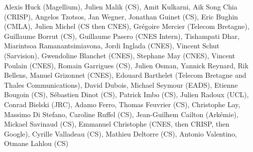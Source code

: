 Alexis Huck (Magellium), Julien Malik (CS), Amit Kulkarni, Aik Song Chia (CRISP), Angelos Tzotsos, Jan Wegner, Jonathan Guinet (CS), Eric Bughin (CMLA), Julien Michel (CS then CNES), Gr\'egoire Mercier (Telecom Bretagne), Guillaume Borrut (CS), Guillaume Pasero (CNES Intern), Tishampati Dhar, Miarintsoa Ramanantsimiavona, Jordi Inglada (CNES), Vincent Schut (Sarvision), Gwendoline Blanchet (CNES), Stephane May (CNES), Vincent Poulain (CNES), Romain Garrigues (CS), Julien Osman, Yannick Reynard, Rik Bellens, Manuel Grizonnet (CNES), Edouard Barthelet (Telecom Bretagne and Thales Communications), David Dubois, Michael Seymour (EADS), Etienne Bougoin (CS), S\'ebastien Dinot (CS), Patrick Imbo (CS), Julien Radoux (UCL), Conrad Bielski (JRC), Adamo Ferro, Thomas Feuvrier (CS), Christophe Lay, Massimo Di Stefano, Caroline Ruffel (CS), Jean-Guilhem Cailton (Ark\'emie), Mickael Savinaud (CS), Emmanuel Christophe (CNES, then CRISP, then Google), Cyrille Valladeau (CS), Mathieu Deltorre (CS), Antonio Valentino, Otmane Lahlou (CS)